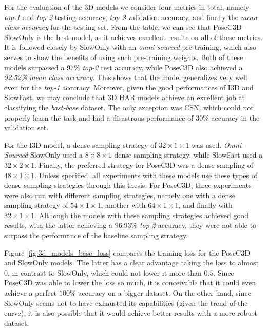 \documentclass[extern,palatino]{cgMA}
\begin{document}
\noindent For the evaluation of the 3D models we consider four metrics in total, namely \textit{top-1} and \textit{top-2} testing accuracy, \textit{top-2} validation accuracy, and finally the \textit{mean class accuracy} for the testing set. From the table, we can see that PoseC3D-SlowOnly is the best model, as it achieves excellent results on all of these metrics. It is followed closely by SlowOnly with an \textit{omni-sourced} pre-training, which also serves to show the benefits of using such pre-training weights. Both of these models surpassed a $97\%$ \textit{top-2} test accuracy, while PoseC3D also achieved a \textit{92.52\%} \textit{mean class accuracy}. This shows that the model generalizes very well even for the \textit{top-1} accuracy. Moreover, given the good performances of I3D and SlowFast, we may conclude that 3D HAR models achieve an excellent job at classifying the \textit{bast-base} dataset. The only exception was CSN, which could not properly learn the task and had a disastrous performance of $30\%$ accuracy in the validation set.

\bigskip
\noindent For the I3D model, a dense sampling strategy of $32 \times 1 \times 1$ was used. \textit{Omni-Sourced} SlowOnly used a $8 \times 8 \times 1$ dense sampling strategy, while SlowFast used a $32 \times 2 \times 1$. Finally, the preferred strategy for PoseC3D was a dense sampling of $48 \times 1 \times 1$. Unless specified, all experiments with these models use these types of dense sampling strategies through this thesis. For PoseC3D, three experiments were also run with different sampling strategies, namely one with a dense sampling strategy of $54 \times 1 \times 1$, another with $64 \times 1 \times 1$, and finally with $32 \times 1 \times 1$. Although the models with these sampling strategies achieved good results, with the latter achieving a $96.93\%$ \textit{top-2} accuracy, they were not able to surpass the performance of the baseline sampling strategy.

\bigskip
\noindent Figure \ref{fig:3d_models_base_loss} compares the training loss for the PoseC3D and SlowOnly models. The latter has a clear advantage taking the loss to almost 0, in contrast to SlowOnly, which could not lower it more than $0.5$. Since PoseC3D was able to lower the loss so much, it is conceivable that it could even achieve a perfect $100\%$ accuracy on a bigger dataset. On the other hand, since SlowOnly seems not to have exhausted its capabilities (given the trend of the curve), it is also possible that it would achieve better results with a more robust dataset. 
\end{document}
